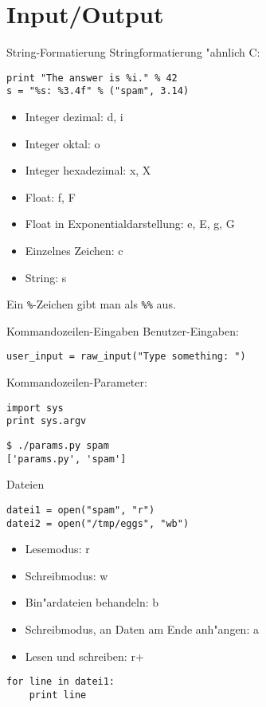 \section{Input/Output}

\begin{frame}[fragile]{String-Formatierung}
Stringformatierung "ahnlich C: 
\begin{lstlisting}[style=Python]
print "The answer is %i." % 42
s = "%s: %3.4f" % ("spam", 3.14)
\end{lstlisting}
\begin{itemize}
\item \alert{Integer dezimal}: d, i
\item Integer oktal: o
\item Integer hexadezimal: x, X
\item \alert{Float}: f, F
\item Float in Exponentialdarstellung: e, E, g, G
\item Einzelnes Zeichen: c
\item \alert{String}: s
\end{itemize}
Ein \texttt{\%}-Zeichen gibt man als \texttt{\%\%} aus.
\end{frame}

\begin{frame}[fragile]{Kommandozeilen-Eingaben}
Benutzer-Eingaben:
\begin{lstlisting}[style=Python]
user_input = raw_input("Type something: ")
\end{lstlisting}
\vspace{3mm}
Kommandozeilen-Parameter:
\begin{lstlisting}[style=Python]
import sys
print sys.argv
\end{lstlisting}
\begin{lstlisting}[style=Shell]
$ ./params.py spam
['params.py', 'spam']
\end{lstlisting} %
\end{frame}

\begin{frame}[fragile]{Dateien}
\begin{lstlisting}[style=Python]
datei1 = open("spam", "r")
datei2 = open("/tmp/eggs", "wb")
\end{lstlisting}
\begin{itemize}
\item Lesemodus: r
\item Schreibmodus: w
\item Bin"ardateien behandeln: b
\item Schreibmodus, an Daten am Ende anh"angen: a
\item Lesen und schreiben: r+
\end{itemize}
\begin{lstlisting}
for line in datei1:
    print line
\end{lstlisting}
\end{frame}

